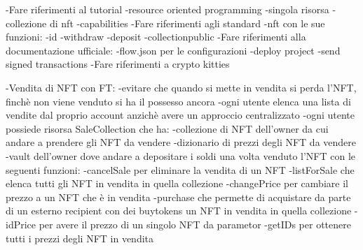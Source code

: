 -Fare riferimenti al tutorial
    -resource oriented programming
        -singola risorsa
        -collezione di nft
    -capabilities
-Fare riferimenti agli standard
    -nft con le sue funzioni:
        -id
        -withdraw
        -deposit
        -collectionpublic
-Fare riferimenti alla documentazione ufficiale:
    -flow.json per le configurazioni
    -deploy project
    -send signed transactions
-Fare riferimenti a crypto kitties

-Vendita di NFT con FT:
    -evitare che quando si mette in vendita si perda l'NFT, finchè non viene venduto si ha il possesso ancora
    -ogni utente elenca una lista di vendite dal proprio account anzichè avere un approccio centralizzato
    -ogni utente possiede risorsa SaleCollection che ha:
        -collezione di NFT dell'owner da cui andare a prendere gli NFT da vendere
        -dizionario di prezzi degli NFT da vendere
        -vault dell'owner dove andare a depositare i soldi una volta venduto l'NFT
        con le seguenti funzioni:
            -cancelSale per eliminare la vendita di un NFT
            -listForSale che elenca tutti gli NFT in vendita in quella collezione
            -changePrice per cambiare il prezzo a un NFT che è in vendita
            -purchase che permette di acquistare da parte di un esterno recipient con dei 
            buytokens un NFT in vendita in quella collezione
            -idPrice per avere il prezzo di un singolo NFT da parametor
            -getIDs per ottenere tutti i prezzi degli NFT in vendita